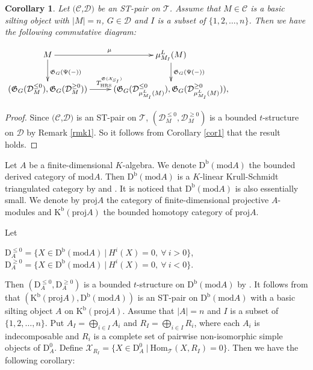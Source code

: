 \documentclass[11pt,a4paper]{amsart}
\numberwithin{equation}{section} \theoremstyle{plain}
\newtheorem{cor}[lem]{Corollary}
\numberwithin{equation}{section} \theoremstyle{definition}
\begin{document}
\begin{cor}\label{cor2} Let $(\mathcal{C}$,$\mathcal{D})$ be an ST-pair on $\mathcal{T}$. Assume that $M\in\mathcal{C}$ is a basic silting object with $|M|=n$, $G\in\mathcal{D}$ and $I$ is a subset of $\{1,2,\ldots,n\}$. Then we have the following commutative diagram:
\begin{center} $\xymatrix@C=25pt@R=20pt{
M\ar[d]^{\mathfrak{G}_{G}(\Psi(-))}\ar[r]^{\mu} &\mu_{M_{I}}^{L}(M)\ar[d]^{\mathfrak{G}_{G}(\Psi(-))}&\\
(\mathfrak{G}_{G}(\mathcal{D}_{M}^{\leq0}),\mathfrak{G}_{G}(\mathcal{D}_{M}^{\geq0}))\ar[r]^{T_{\mathrm{HRS}}^{\mathfrak{G}(\mathcal{X}_{S_{I}})}}& (\mathfrak{G}_{G}(\mathcal{D}_{\mu_{M_{I}}^{L}(M)}^{\leq0}),\mathfrak{G}_{G}(\mathcal{D}_{\mu_{M_{I}}^{L}(M)}^{\geq0})),&}$
\end{center}
\end{cor}
\begin{proof} Since $(\mathcal{C}$,$\mathcal{D})$ is an ST-pair on $\mathcal{T}$, $(\mathcal{D}_{M}^{\leq0},\mathcal{D}_{M}^{\geq0})$ is a bounded $t$-structure on $\mathcal{D}$ by Remark \ref{rmk1}. So it follows from Corollary \ref{cor1} that the result holds.
\end{proof}


Let $A$ be a finite-dimensional $K$-algebra. We denote $\mathrm{D}^{\mathrm{b}}(\mathrm{mod}A)$ the bounded derived
category of $\mathrm{mod}A$. Then $\mathrm{D}^{\mathrm{b}}(\mathrm{mod}A)$ is a $K$-linear Krull-Schmidt triangulated category by \cite[Theorem 1]{A1} and \cite[Lemma 2.1]{HKP}. It is noticed that $\mathrm{D}^{\mathrm{b}}(\mathrm{mod}A)$ is also essentially small. We denote by $\mathrm{proj}A$ the category of finite-dimensional projective $A$-modules and $\mathrm{K}^{\mathrm{b}}(\mathrm{proj}A)$ the bounded homotopy category of $\mathrm{proj}A$.

Let
\begin{center}
$\mathrm{D}^{\leq0}_{A}=\{X\in\mathrm{D^{b}}(\mathrm{mod}A)~|~H^{i}(X)=0,~\forall~i>0\}$,\\
$\mathrm{D}^{\geq0}_{A}=\{X\in\mathrm{D^{b}}(\mathrm{mod}A)~|~H^{i}(X)=0,~\forall~i<0\}$.
\end{center}Then $(\mathrm{D}^{\leq0}_{A},\mathrm{D}^{\geq0}_{A})$ is a bounded $t$-structure on $\mathrm{D}^{\mathrm{b}}(\mathrm{mod}A)$ by \cite[Example 1.3.2(i)]{BBD}. It follows from \cite[Lemma 4.10]{AMY} that $(\mathrm{K}^{\mathrm{b}}(\mathrm{proj}A),\mathrm{D}^{\mathrm{b}}(\mathrm{mod}A))$ is an ST-pair on $\mathrm{D}^{\mathrm{b}}(\mathrm{mod}A)$ with a basic silting object $A$ on $\mathrm{K}^{\mathrm{b}}(\mathrm{proj}A)$. Assume that $|A|=n$ and $I$ is a subset of $\{1,2,\ldots,n\}$. Put $A_{I}=\bigoplus_{i\in I}A_{i}$ and $R_{I}=\bigoplus_{i\in I}R_{i}$, where each $A_{i}$ is indecomposable and $R_{i}$ is a complete set of pairwise non-isomorphic simple objects of $\mathrm{D}_{A}^{0}$. Define $\mathcal{X}_{R_{I}}=\{X\in\mathrm{D}_{A}^{0}~|~\mathrm{Hom}_{\mathcal{T}}(X,R_{I})=0\}$. Then we have the following corollary:
\end{document}
